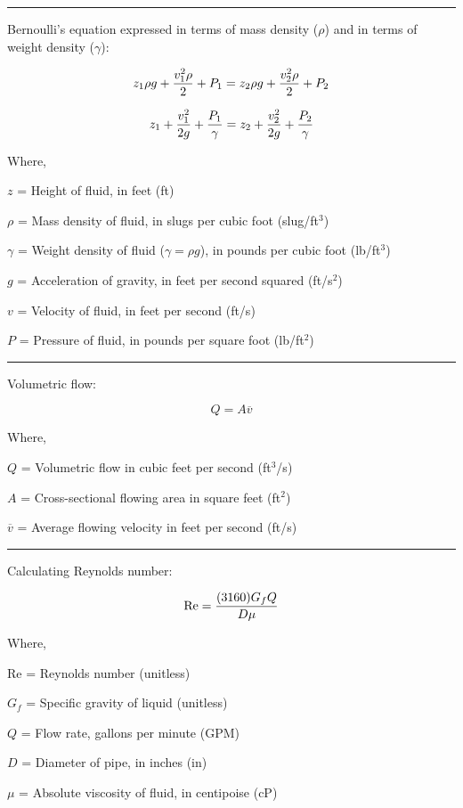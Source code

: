 

\vskip 10pt
\hrule
\vskip 10pt

Bernoulli's equation expressed in terms of mass density ($\rho$) and in terms of weight density ($\gamma$):

$$z_1 \rho g + {v_1^2 \rho \over 2} + P_1 = z_2 \rho g + {v_2^2 \rho \over 2} + P_2$$

$$z_1 + {v_1^2 \over {2 g}} + {P_1 \over \gamma} = z_2 + {v_2^2 \over {2 g}} + {P_2 \over \gamma}$$

\noindent
Where,

$z$ = Height of fluid, in feet (ft)

$\rho$ = Mass density of fluid, in slugs per cubic foot (slug/ft$^{3}$)

$\gamma$ = Weight density of fluid ($\gamma = \rho g$), in pounds per cubic foot (lb/ft$^{3}$)

$g$ = Acceleration of gravity, in feet per second squared (ft/s$^{2}$)

$v$ = Velocity of fluid, in feet per second (ft/s)

$P$ = Pressure of fluid, in pounds per square foot (lb/ft$^{2}$)

\vskip 10pt
\hrule
\vskip 10pt

Volumetric flow:

$$Q = A \overline{v}$$

\noindent
Where,

$Q$ = Volumetric flow in cubic feet per second (ft$^{3}$/s)

$A$ = Cross-sectional flowing area in square feet (ft$^{2}$)

$\overline{v}$ = Average flowing velocity in feet per second (ft/s)
\vskip 10pt
\hrule
\vskip 10pt

Calculating Reynolds number:

$$\hbox{Re} = {{(3160) G_f Q} \over {D \mu}}$$

\noindent
Where,

Re = Reynolds number (unitless)

$G_f$ = Specific gravity of liquid (unitless)

$Q$ = Flow rate, gallons per minute (GPM)

$D$ = Diameter of pipe, in inches (in)

$\mu$ = Absolute viscosity of fluid, in centipoise (cP)

